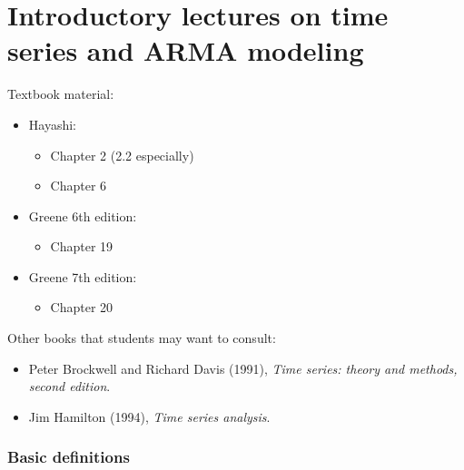 

\part*{Introductory lectures on time series and ARMA modeling}

Textbook material:
\begin{itemize}
\item Hayashi:
  \begin{itemize}
  \item Chapter 2 (2.2 especially)
  \item Chapter 6
  \end{itemize}
\item Greene 6th edition:
  \begin{itemize}
  \item Chapter 19
  \end{itemize}
\item Greene 7th edition:
  \begin{itemize}
  \item Chapter 20
  \end{itemize}
\end{itemize}

Other books that students may want to consult:
\begin{itemize}
\item Peter Brockwell and Richard Davis (1991), \emph{Time series:
    theory and methods, second edition}.
\item Jim Hamilton (1994), \emph{Time series analysis}.
\end{itemize}

\section{Basic definitions}

